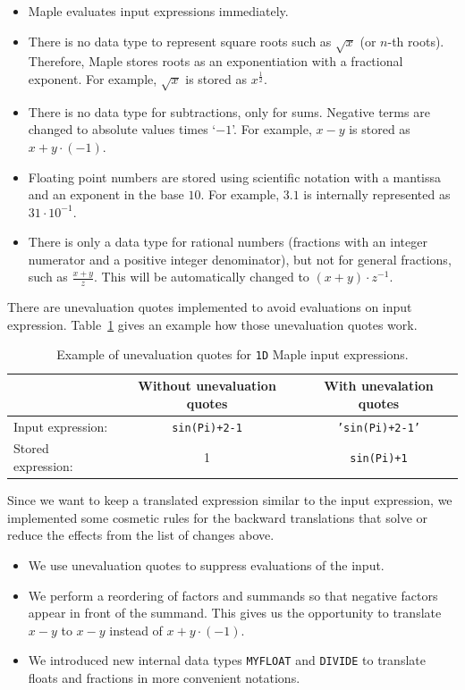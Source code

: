\documentclass[a4paper,11pt]{article}
\newcommand{\Maple}{Maple}
\theoremstyle{defTheoStyle}
\theoremstyle{defExampStyle}
\begin{document}
\begin{itemize}
\item \Maple{} evaluates input expressions immediately.
\item There is no data type to represent square roots such as $\sqrt{x}$ (or $n$-th roots). Therefore, \Maple{} stores roots as an exponentiation with a fractional exponent. For example, $\sqrt{x}$ is stored as $x^{\frac{1}{2}}$.
\item There is no data type for subtractions, only for sums. Negative terms are changed to absolute values times `$-1$'. For example, $x-y$ is stored as $x + y \cdot (-1)$. 
\item Floating point numbers are stored using scientific notation with a mantissa and an exponent in the base $10$. For example, $3.1$ is internally represented as $31 \cdot 10^{-1}$.
\item There is only a data type for rational numbers (fractions with an integer numerator and a positive integer denominator), but not for general fractions, such as $\frac{x+y}{z}$. This will be automatically changed to $(x+y)\cdot z^{-1}$.
\end{itemize}

There are unevaluation quotes implemented to avoid evaluations on input expression. Table~\ref{tab:unevaluation-quotes} gives an example how those unevaluation quotes work.

\begin{table}[ht]
\centering
\begin{tabular}{lcc}
\hline
& Without unevaluation quotes & With unevalation quotes\\
\hline
Input expression: & \texttt{sin(Pi)+2-1} & \texttt{'sin(Pi)+2-1'}\\
Stored expression: & 1 & \texttt{sin(Pi)+1}\\
\hline
\end{tabular}
\caption{Example of unevaluation quotes for \texttt{1D} \Maple{} input expressions.}
\label{tab:unevaluation-quotes}
\end{table}

Since we want to keep a translated expression similar to the input expression, we implemented some cosmetic rules for the backward translations that solve or reduce the effects from the list of changes above. 
\begin{itemize}
\item We use unevaluation quotes to suppress evaluations of the input.
\item We perform a reordering of factors and summands so that negative factors appear in front of the summand. This gives us the opportunity to translate $x - y$ to $x - y$ instead of $x + y \cdot (-1)$.
\item We introduced new internal data types \texttt{MYFLOAT} and \texttt{DIVIDE} to translate floats and fractions in more convenient notations.
\end{itemize}
\end{document}
